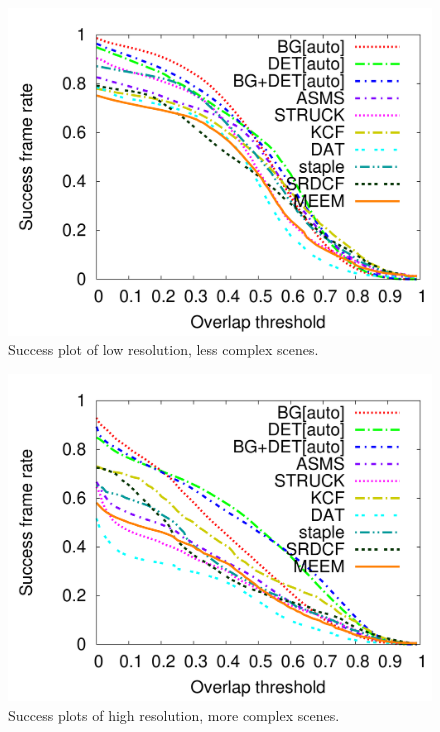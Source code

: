 \begin{figure}
  \centering
    \includegraphics[width=\linewidth]{./img/evaluation/success_lowRes.pdf}
    \caption{Success plot of low resolution, less complex scenes.}
    \label{fig:kf-eval-success-low}
\end{figure}
\begin{figure}
  \includegraphics[width=\linewidth]{./img/evaluation/success_highRes.pdf}
    \caption{Success plots of high resolution, more complex scenes.}
  \label{fig:kf-eval-success-high}
\end{figure}